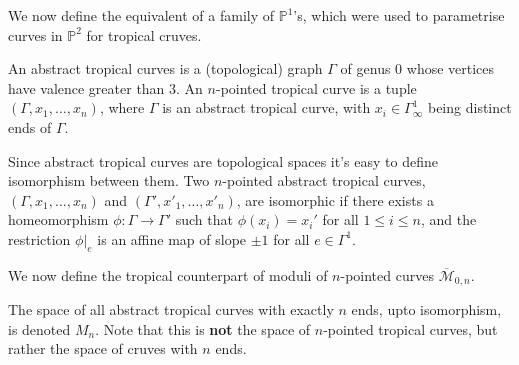 We now define the equivalent of a family of $\mathbb{P}^{1}$'s, which were used to parametrise curves in $\mathbb{P}^{2}$ for tropical cruves.

\begin{definition}
    An abstract tropical curves is a (topological) graph $\Gamma$ of genus $0$ whose vertices have valence greater than $3$.
    An $n$-pointed tropical curve is a tuple $(\Gamma, x_{1}, \dots, x_{n})$, where $\Gamma$ is an abstract tropical curve, with $x_{i} \in \Gamma^{1}_{\infty}$ being distinct ends of $\Gamma$.
\end{definition}

Since abstract tropical curves are topological spaces it's easy to define isomorphism between them.
Two $n$-pointed abstract tropical curves, $(\Gamma, x_{1}, \dots, x_{n})$ and $(\Gamma', x'_{1}, \dots, x'_{n})$, are isomorphic if there exists a homeomorphism $\phi: \Gamma \to \Gamma'$ such that $\phi(x_{i}) = x_{i}'$ for all $1\leq i\leq n$, 
and the restriction $\phi |_{e}$ is an affine map of slope $\pm 1$ for all $e \in \Gamma^{1}$.

\par We now define the tropical counterpart of moduli of $n$-pointed curves $\overline{\mathcal{M}}_{0,n}$.

\begin{definition}
    The space of all abstract tropical curves with exactly $n$ ends, upto isomorphism, is denoted $M_{n}$. 
    Note that this is \textbf{not} the space of $n$-pointed tropical curves, but rather the space of cruves with $n$ ends.
\end{definition}

